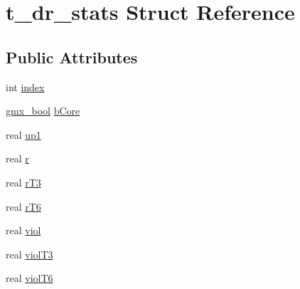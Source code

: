 \hypertarget{structt__dr__stats}{\section{t\-\_\-dr\-\_\-stats \-Struct \-Reference}
\label{structt__dr__stats}
}
\subsection*{\-Public \-Attributes}
\begin{DoxyCompactItemize}
\item 
int \hyperlink{structt__dr__stats_a370117c47a10cc11a5052f59eb48f194}{index}
\item 
\hyperlink{include_2types_2simple_8h_a8fddad319f226e856400d190198d5151}{gmx\-\_\-bool} \hyperlink{structt__dr__stats_a1dcf538aa2e7f5700cd36566d059269e}{b\-Core}
\item 
real \hyperlink{structt__dr__stats_a33f831d1b62e1904773e34bc145ab437}{up1}
\item 
real \hyperlink{structt__dr__stats_ad5869b91deaa4a8b31812d015e2b0c22}{r}
\item 
real \hyperlink{structt__dr__stats_af5020f0342249fcbde91b1f2e47e0f79}{r\-T3}
\item 
real \hyperlink{structt__dr__stats_a13849337a19a401384fad985e6278e6b}{r\-T6}
\item 
real \hyperlink{structt__dr__stats_a7566e50413828da007f25cef7584ba39}{viol}
\item 
real \hyperlink{structt__dr__stats_a258d37b717e9da0af47822c6cdb70566}{viol\-T3}
\item 
real \hyperlink{structt__dr__stats_a7e19ea93de8d3e81fd132e9d5628ccf5}{viol\-T6}
\end{DoxyCompactItemize}


